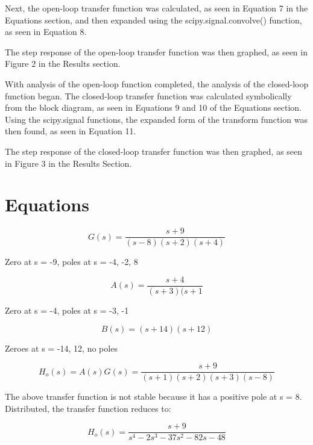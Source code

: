\documentclass[12pt]{article}
\begin{document}

Next, the open-loop transfer function was calculated, as seen in Equation 7 in the Equations section, and then expanded using the scipy.signal.convolve() function, as seen in Equation 8.


The step response of the open-loop transfer function was then graphed, as seen in Figure 2 in the Results section.


With analysis of the open-loop function completed, the analysis of the closed-loop function began. The closed-loop transfer function was calculated symbolically from the block diagram, as seen in Equations 9 and 10 of the Equations section. Using the scipy.signal functions, the expanded form of the transform function was then found, as seen in Equation 11.

The step response of the closed-loop transfer function was then graphed, as seen in Figure 3 in the Results Section.

\section{Equations}

\begin{equation}
    G(s) = \frac{s+9}{(s-8)(s+2)(s+4)}
\end{equation}

Zero at s = -9, poles at s = -4, -2, 8

\begin{equation}
    A(s) = \frac{s+4}{(s+3)(s+1}
\end{equation}

Zero at s = -4, poles at s = -3, -1

\begin{equation}
    B(s) = (s+14)(s+12)
\end{equation}

Zeroes at s = -14, 12, no poles

\begin{equation}
    H_o(s) = A(s)G(s) = \frac{s+9}{(s+1)(s+2)(s+3)(s-8)}
\end{equation}

The above transfer function is not stable because it has a positive pole at s = 8. Distributed, the transfer function reduces to:

\begin{equation}
    H_o(s) = \frac{s+9}{s^4-2s^3-37s^2-82s-48}
\end{equation}
\end{document}
